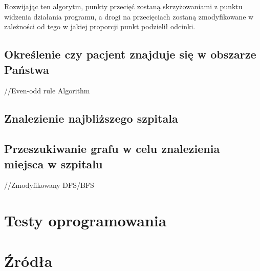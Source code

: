\documentclass[10pt,a4paper]{article}
\begin{document}
Rozwijając ten algorytm, punkty przecięć zostaną skrzyżowaniami z punktu widzenia działania programu, a drogi na przecięciach zostaną zmodyfikowane w zależności od tego w jakiej proporcji punkt podzielił odcinki.


\subsection{Określenie czy pacjent znajduje się w obszarze Państwa}

//Even-odd rule Algorithm

\subsection{Znalezienie najbliższego szpitala}

\subsection{Przeszukiwanie grafu w celu znalezienia miejsca w szpitalu}

//Zmodyfikowany DFS/BFS

\section{Testy oprogramowania}


\section{Źródła}
\end{document}

